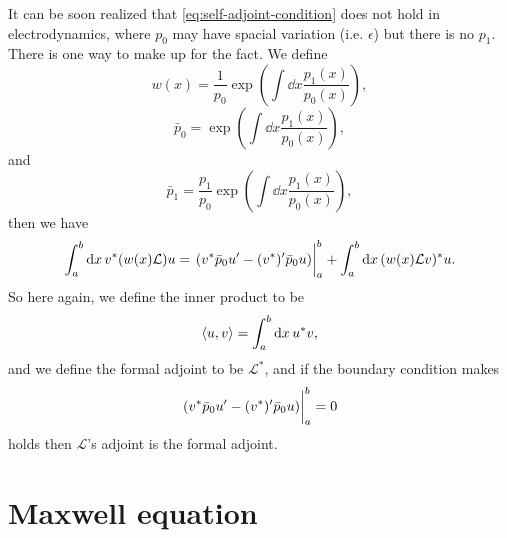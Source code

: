 \documentclass[hyperref, a4paper]{article}
\begin{document}
It can be soon realized that \eqref{eq:self-adjoint-condition} does not hold in electrodynamics, 
where $p_0$ may have spacial variation (i.e. $\epsilon$) but there is no $p_1$.
There is one way to make up for the fact. We define 
\begin{equation}
    w(x) = \frac{1}{p_0} \exp(\int \dd{x} \frac{p_1(x)}{p_0(x)}),
\end{equation}
\begin{equation}
    \bar{p}_0 = \exp(\int \dd{x} \frac{p_1(x)}{p_0(x)}),
\end{equation}
and 
\begin{equation}
    \bar{p}_1 = \frac{p_1}{p_0} \exp(\int \dd{x} \frac{p_1(x)}{p_0(x)}),
\end{equation}
then we have 
\begin{equation}
    \int_a^b \dd{x} v^* (w(x) \mathcal{L}) u = 
    \eval{(v^* \bar{p}_0 u' - (v^*)' \bar{p}_0 u)}_a^b + \int_a^b \dd{x} (w(x) \mathcal{L} v)^* u. 
\end{equation}
So here again, we define the inner product to be 
\begin{equation}
    \expval{u, v} = \int_a^b \dd{x} u^* v,
\end{equation}
and we define the formal adjoint to be $\mathcal{L}^*$, and if the boundary condition makes 
\begin{equation}
    \eval{(v^* \bar{p}_0 u' - (v^*)' \bar{p}_0 u)}_a^b = 0
\end{equation}
holds then $\mathcal{L}$'s adjoint is the formal adjoint.

\section{Maxwell equation}
\end{document}
